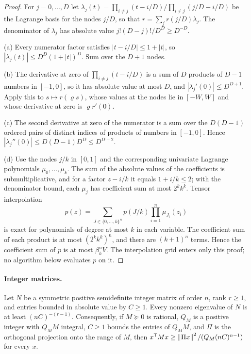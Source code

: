 \begin{proof}
For $j=0,\ldots,D$ let
$\lambda_j(t)=\prod_{i\ne j}(t-i/D)/\prod_{i\ne j}(j/D-i/D)$ be the
Lagrange basis for the nodes $j/D$, so that
$r=\sum_jr(j/D)\lambda_j$. The denominator of $\lambda_j$ has absolute
value $j!(D-j)!/D^D\ge D^{-D}$.

(a) Every numerator factor satisfies $|t-i/D|\le1+|t|$, so
$|\lambda_j(t)|\le D^D(1+|t|)^D$. Sum over the $D+1$ nodes.

(b) The derivative at zero of $\prod_{i\ne j}(t-i/D)$ is a sum of $D$
products of $D-1$ numbers in $[-1,0]$, so it has absolute value at most
$D$, and $|\lambda_j'(0)|\le D^{D+1}$. Apply this to
$s\mapsto r(\varrho s)$, whose values at the nodes lie in $[-W,W]$ and whose
derivative at zero is $\varrho r'(0)$.

(c) The second derivative at zero of the numerator is a sum over the
$D(D-1)$ ordered pairs of distinct indices of products of numbers in
$[-1,0]$. Hence $|\lambda_j''(0)|\le D(D-1)D^D\le D^{D+2}$.

(d) Use the nodes $j/k$ in $[0,1]$ and the corresponding univariate Lagrange
polynomials $\mu_0,\ldots,\mu_k$. The sum of the absolute values of the
coefficients is submultiplicative, and for a factor $z-i/k$ it equals
$1+i/k\le2$; with the denominator bound, each $\mu_j$ has coefficient sum at
most $2^kk^k$. Tensor interpolation
\[
 p(z)=\sum_{J\in\{0,\ldots,k\}^n}p(J/k)\prod_{i=1}^n\mu_{J_i}(z_i)
\]
is exact for polynomials of degree at most $k$ in each variable. The
coefficient sum of each product is at most $(2^kk^k)^n$, and there are
$(k+1)^n$ terms. Hence the coefficient sum of $p$ is at most $\beta_k^nV$.
The interpolation grid enters only this proof; no algorithm below
evaluates $p$ on it.
\end{proof}

\paragraph{Integer matrices.}

\begin{lemma}\label{lem:points-integer-eigen}
Let $N$ be a symmetric positive semidefinite integer matrix of order $n$,
rank $r\ge1$, and entries bounded in absolute value by $C\ge1$. Every
nonzero eigenvalue of $N$ is at least $(nC)^{-(r-1)}$. Consequently, if
$M\succeq0$ is rational, $Q_M$ is a positive integer with $Q_MM$ integral,
$C\ge1$ bounds the entries of $Q_MM$, and $\Pi$ is the orthogonal
projection onto the range of $M$, then
$x^{\mathsf T}Mx\ge\left\lVert\Pi x\right\rVert^2/(Q_M(nC)^{n-1})$ for every $x$.
\end{lemma}

